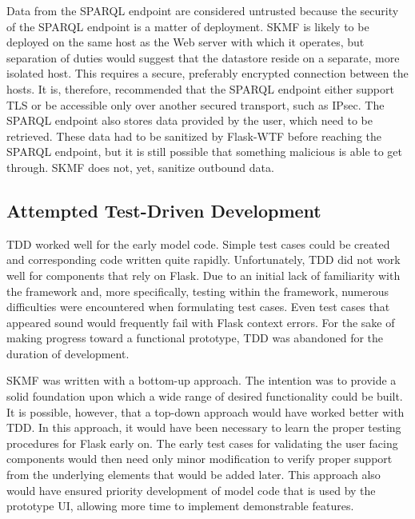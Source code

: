 Data from the SPARQL endpoint are considered untrusted because the security of the SPARQL endpoint is a matter of deployment. SKMF is likely to be deployed on the same host as the Web server with which it operates, but separation of duties would suggest that the datastore reside on a separate, more isolated host. This requires a secure, preferably encrypted connection between the hosts. It is, therefore, recommended that the SPARQL endpoint either support TLS or be accessible only over another secured transport, such as IPsec. The SPARQL endpoint also stores data provided by the user, which need to be retrieved. These data had to be sanitized by Flask-WTF before reaching the SPARQL endpoint, but it is still possible that something malicious is able to get through. SKMF does not, yet, sanitize outbound data.


\subsection{Attempted Test-Driven Development}

TDD worked well for the early model code. Simple test cases could be created and corresponding code written quite rapidly. Unfortunately, TDD did not work well for components that rely on Flask. Due to an initial lack of familiarity with the framework and, more specifically, testing within the framework, numerous difficulties were encountered when formulating test cases. Even test cases that appeared sound would frequently fail with Flask context errors. For the sake of making progress toward a functional prototype, TDD was abandoned for the duration of development.

SKMF was written with a bottom-up approach. The intention was to provide a solid foundation upon which a wide range of desired functionality could be built. It is possible, however, that a top-down approach would have worked better with TDD. In this approach, it would have been necessary to learn the proper testing procedures for Flask early on. The early test cases for validating the user facing components would then need only minor modification to verify proper support from the underlying elements that would be added later. This approach also would have ensured priority development of model code that is used by the prototype UI, allowing more time to implement demonstrable features.
